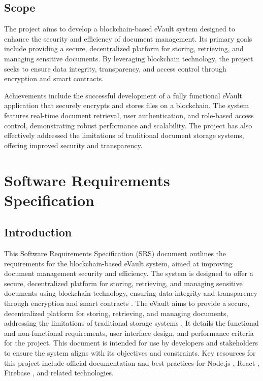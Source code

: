 \documentclass[12pt,a4paper]{report}
\begin{document}
\section{Scope}
The project aims to develop a blockchain-based eVault system 
designed to enhance the security and efficiency of document 
management. Its primary goals include providing a secure, 
decentralized platform for storing, retrieving, and managing 
sensitive documents. By leveraging blockchain technology, the 
project seeks to ensure data integrity, transparency, and access 
control through encryption and smart contracts.

Achievements include the successful development of a fully 
functional eVault application that securely encrypts and stores 
files on a blockchain. The system features real-time document 
retrieval, user authentication, and role-based access control, 
demonstrating robust performance and scalability. The project has 
also effectively addressed the limitations of traditional document 
storage systems, offering improved security and transparency.

\chapter{Software Requirements Specification}

\section{Introduction}

This Software Requirements Specification (SRS) document outlines 
the requirements for the blockchain-based eVault system, aimed at 
improving document management security and efficiency. The system 
is designed to offer a secure, decentralized platform for storing, 
retrieving, and managing sensitive documents using blockchain 
technology, ensuring data integrity and transparency through 
encryption and smart contracts \cite{antonopoulos2018mastering}. 
The eVault aims to provide a secure, decentralized platform for 
storing, retrieving, and managing documents, addressing the 
limitations of traditional storage systems \cite{nodedocs, reactdocs,firebasedocs}. 
It details the functional and non-functional requirements, user 
interface design, and performance criteria for the project. This 
document is intended for use by developers and stakeholders to 
ensure the system aligns with its objectives and constraints. 
Key resources for this project include official documentation 
and best practices for Node.js \cite{nodedocs}, React \cite{reactdocs}, 
Firebase \cite{firebasedocs}, and related technologies.
\end{document}
